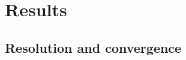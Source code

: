 \documentclass[preprint2]{aastex63}
\newcommand{\fg}[1]{\textcolor{midgreen}{#1}}
\newcommand{\fag}[1]{\textcolor{midblue}{FAG: #1}}
\begin{document}



\section{Results} \label{sec:results}


\subsection{\fg{Resolution and convergence}} \label{sec:conv}
\end{document}
